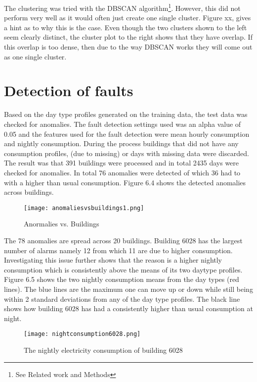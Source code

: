 The clustering was tried with the DBSCAN algorithm\footnote{See Related work and Methods}. However, this did not perform very well as it would often just create one single cluster. Figure xx, gives a hint as to why this is the case. Even though the two clusters shown to the left seem clearly distinct, the cluster plot to the right shows that they have overlap. If this overlap is too dense, then due to the way DBSCAN works they will come out as one single cluster.

\section*{Detection of faults}
Based on the day type profiles generated on the training data, the test data was checked for anomalies. The fault detection settings used was an alpha value of 0.05 and the features used for the fault detection were mean hourly consumption and nightly consumption. During the process buildings that did not have any consumption profiles, (due to missing) or days with missing data were discarded. The result was that 391 buildings were processed and in total 2435 days were checked for anomalies. In total 76 anomalies were detected of which 36 had to with a higher than usual consumption. Figure 6.4 shows the detected anomalies across buildings.
\begin{figure}
\begin{center}
\texttt{[image: anomaliesvsbuildings1.png]}
\end{center}
\caption{Anormalies vs. Buildings}
\end{figure}

The 78 anomalies are spread across 20 buildings. Building 6028 has the largest number of alarms namely 12 from which 11 are due to higher consumption. Investigating this issue further shows that the reason is a higher nightly consumption which is consistently above the means of its two daytype profiles. Figure 6.5 shows the two nightly consumption means from the day types (red lines). The blue lines are the maximum one can move up or down while still being within 2 standard deviations from any of the day type profiles. The black line shows how building 6028 has had a consistently higher than usual consumption at night.
\begin{figure}
\begin{center}
\texttt{[image: nightconsumption6028.png]}
\end{center}
\caption{The nightly electricity consumption of building 6028}
\end{figure}


